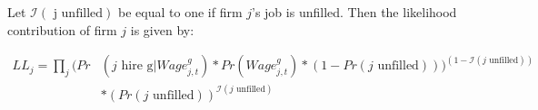 \documentclass[12pt]{article}
\begin{document}



%

Let $\mathcal{I}( \text{ j unfilled})$ be equal to one if firm $j$'s job is unfilled. Then the likelihood contribution of firm $j$ is given by:

\begin{align*}
LL_j  =  \prod_j ( Pr&(\text{$j$ hire g} | Wage^g_{j,t})*Pr(Wage^g_{j,t})*(1-Pr( \text{$j$ unfilled})))^{(1-\mathcal{I}(\text{$j$ unfilled}))}\\
&*(Pr(\text{$j$ unfilled}))^{\mathcal{I}(\text{$j$ unfilled})} \\
\end{align*}
\end{document}
